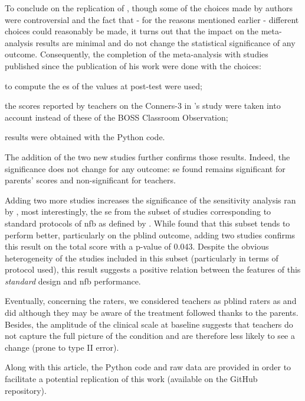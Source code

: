 To conclude on the replication of \citet{Cortese2016}, though some of the choices made by authors
were controversial and the fact that - for the reasons mentioned earlier - different choices could reasonably be made, 
it turns out that the impact on the meta-analysis results are minimal and do not change the statistical significance of any outcome. 
Consequently, the completion of the meta-analysis with studies published since the publication of his work were done with the choices: 
\begin{description} 
	\item to compute the \gls{es} of \citet{Arnold2014} the values at post-test were used;
	\item the scores reported by teachers on the Conners-3 in \citeauthor{Steiner2014}'s study were taken into account instead of these of 
	the BOSS Classroom Observation;
	\item results were obtained with the Python code.
\end{description} 

The addition of the two new studies \citep{Strehl2017, Baumeister2016} further confirms those results. Indeed, 
the significance does not change for any outcome: \gls{se} found remains significant for parents' scores and 
non-significant for teachers. 

Adding two more studies increases the significance of the sensitivity analysis ran by \citeauthor{Cortese2016}, 
most interestingly, the \gls{se} from the subset of studies corresponding to standard protocols of \gls{nfb} as 
defined by \citet{Arns2014}. While \citeauthor{Cortese2016} found that this subset tends to perform better, particularly
 on the \gls{pblind} outcome, adding two studies confirms this result on the total score with a p-value of 0.043. 
Despite the obvious heterogeneity of the studies included in this subset (particularly in terms of protocol used), 
this result suggests a positive relation between the features of this \emph{standard} design and \gls{nfb} performance.

Eventually, concerning the raters, we considered teachers as \gls{pblind} raters as \citeauthor{Cortese2016} and 
\citeauthor{Micoulaud2014} did although they may be aware of the treatment followed thanks to the parents. 
Besides, the amplitude of the clinical scale at baseline suggests that teachers do not capture the full picture of 
the condition and are therefore less likely to see a change (prone to type II error).

Along with this article, the Python code and raw data are provided in order to facilitate a potential replication of this work
(available on the GitHub repository).  

